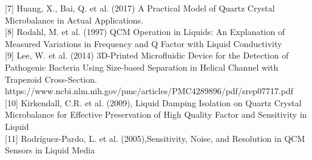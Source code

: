 \documentclass[a4paper, 10pt, conference]{ieeeconf}      %
\begin{document}
[7] Huang, X., Bai, Q. et al. (2017) A Practical Model of Quartz Crystal Microbalance in Actual Applications. \\

[8] Rodahl, M. et al. (1997) QCM Operation in Liquids: An Explanation of Measured Variations in Frequency and Q Factor with Liquid Conductivity \\

[9]  Lee, W. et al. (2014) 3D-Printed Microfluidic Device for the Detection of Pathogenic Bacteria Using Size-based Separation in Helical Channel with Trapezoid Cross-Section.
https://www.ncbi.nlm.nih.gov/pmc/articles/PMC4289896/pdf/srep07717.pdf \\

[10] Kirkendall, C.R. et al. (‎2009), Liquid Damping Isolation on Quartz Crystal Microbalance for Effective Preservation of High Quality Factor and Sensitivity in Liquid \\

[11] Rodríguez-Pardo, L. et al.  (2005),Sensitivity, Noise, and Resolution in QCM Sensors in Liquid Media \\






\end{document}
